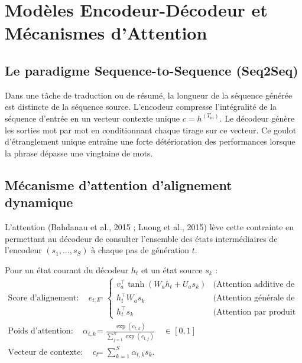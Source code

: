 
\section{Modèles Encodeur-Décodeur et Mécanismes d'Attention}

\subsection{Le paradigme Sequence-to-Sequence (Seq2Seq)}

Dans une tâche de traduction ou de résumé, la longueur de la séquence générée est distincte de la séquence source. L'encodeur compresse l'intégralité de la séquence d'entrée en un vecteur contexte unique $c = h^{(T_{\mathrm{in}})}$. Le décodeur génère les sorties mot par mot en conditionnant chaque tirage sur ce vecteur. Ce goulot d'étranglement unique entraîne une forte détérioration des performances lorsque la phrase dépasse une vingtaine de mots.

\subsection{Mécanisme d'attention d'alignement dynamique}

L'attention (Bahdanau et al., 2015 ; Luong et al., 2015) lève cette contrainte en permettant au décodeur de consulter l'ensemble des états intermédiaires de l'encodeur $(s_1, \dots, s_S)$ à chaque pas de génération $t$.

\begin{definition}
    Pour un état courant du décodeur $h_t$ et un état source $s_k$ :
    \begin{align}
        \text{Score d'alignement} : \quad e_{t, k} &= 
        \begin{cases}
            v_a^\top \tanh\left( W_a h_t + U_a s_k \right) & \text{(Attention additive de Bahdanau)} \\
            h_t^\top W_a s_k & \text{(Attention générale de Luong)} \\
            h_t^\top s_k & \text{(Attention par produit scalaire direct)}
        \end{cases} \\
        \text{Poids d'attention} : \quad \alpha_{t, k} &= \frac{\exp(e_{t, k})}{\sum_{j=1}^S \exp(e_{t, j})} \quad \in [0, 1] \\
        \text{Vecteur de contexte} : \quad c_t &= \sum_{k=1}^S \alpha_{t, k} s_k.
    \end{align}
\end{definition}


